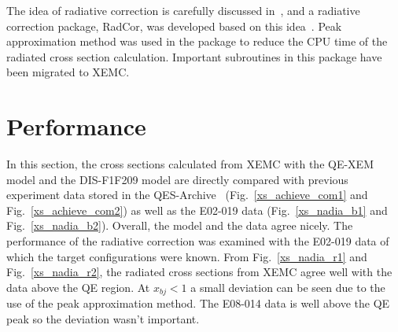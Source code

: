    The idea of radiative correction is carefully discussed in~\cite{mo_sai_rad, stein_radiation}, and a radiative correction package, RadCor, was developed based on this idea~\cite{karl_thesis,hyao_thesis}. Peak approximation method was used in the package to reduce the CPU time of the radiated cross section calculation. Important subroutines in this package have been migrated to XEMC. 
   
 \section{Performance} 
  In this section, the cross sections calculated from XEMC with the QE-XEM model and the DIS-F1F209 model are directly compared with previous experiment data stored in the QES-Archive~\cite{qe_donal} (Fig.~\ref{xs_achieve_com1} and Fig.~\ref{xs_achieve_com2}) as well as the E02-019 data (Fig.~\ref{xs_nadia_b1} and Fig.~\ref{xs_nadia_b2}). Overall, the model and the data agree nicely. The performance of the radiative correction was examined with the E02-019 data of which the target configurations were known. From Fig.~\ref{xs_nadia_r1} and Fig.~\ref{xs_nadia_r2}, the radiated cross sections from XEMC agree well with the data above the QE region. At $x_{bj}<1$ a small deviation can be seen due to the use of the peak approximation method. The E08-014 data is well above the QE peak so the deviation wasn't important. 
